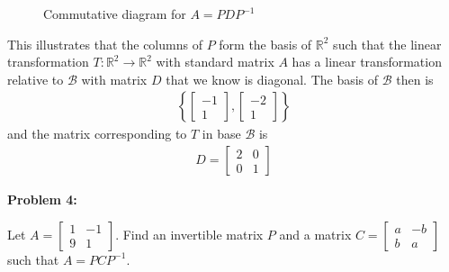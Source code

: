\documentclass[10pt,letterpaper,final]{report}
\newcommand{\R}{\mathbb{R}}
\begin{document}
\begin{figure}[H]
  \centering
  \caption{Commutative diagram for $A = PDP^{-1}$}\label{fig:commutative-diagram}
\end{figure}

This illustrates that the columns of $P$ form the basis of $\R^2$ such that the linear transformation $T: \R^2 \to \R^2$ with standard matrix $A$ has a linear transformation relative to $\mathcal{B}$ with matrix $D$ that we know is diagonal. The basis of $\mathcal{B}$ then is
\begin{align*}
  \left\{\begin{bmatrix}
           -1 \\
           1
         \end{bmatrix}, \begin{bmatrix}
                          -2 \\
                          1
                        \end{bmatrix}\right\}
\end{align*}
and the matrix corresponding to $T$ in base $\mathcal{B}$ is
\begin{align*}
  D = \begin{bmatrix}
        2 & 0 \\
        0 & 1
      \end{bmatrix}
\end{align*}

\pagebreak

\noindent\textbf{Problem 4:}
\medskip

Let $A = \begin{bmatrix}
    1 & -1 \\
    9 & 1
  \end{bmatrix}$. Find an invertible matrix $P$ and a matrix $C = \begin{bmatrix}
    a & -b \\
    b & a
  \end{bmatrix}$ such that $A = PCP^{-1}$.
\end{document}
